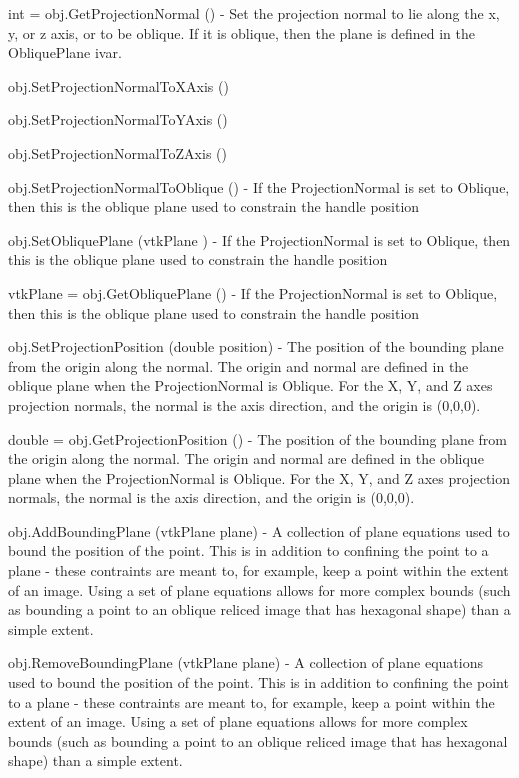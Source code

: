 \begin{DoxyItemize}
\item {\ttfamily int = obj.\-Get\-Projection\-Normal ()} -\/ Set the projection normal to lie along the x, y, or z axis, or to be oblique. If it is oblique, then the plane is defined in the Oblique\-Plane ivar.  
\item {\ttfamily obj.\-Set\-Projection\-Normal\-To\-X\-Axis ()}  
\item {\ttfamily obj.\-Set\-Projection\-Normal\-To\-Y\-Axis ()}  
\item {\ttfamily obj.\-Set\-Projection\-Normal\-To\-Z\-Axis ()}  
\item {\ttfamily obj.\-Set\-Projection\-Normal\-To\-Oblique ()} -\/ If the Projection\-Normal is set to Oblique, then this is the oblique plane used to constrain the handle position  
\item {\ttfamily obj.\-Set\-Oblique\-Plane (vtk\-Plane )} -\/ If the Projection\-Normal is set to Oblique, then this is the oblique plane used to constrain the handle position  
\item {\ttfamily vtk\-Plane = obj.\-Get\-Oblique\-Plane ()} -\/ If the Projection\-Normal is set to Oblique, then this is the oblique plane used to constrain the handle position  
\item {\ttfamily obj.\-Set\-Projection\-Position (double position)} -\/ The position of the bounding plane from the origin along the normal. The origin and normal are defined in the oblique plane when the Projection\-Normal is Oblique. For the X, Y, and Z axes projection normals, the normal is the axis direction, and the origin is (0,0,0).  
\item {\ttfamily double = obj.\-Get\-Projection\-Position ()} -\/ The position of the bounding plane from the origin along the normal. The origin and normal are defined in the oblique plane when the Projection\-Normal is Oblique. For the X, Y, and Z axes projection normals, the normal is the axis direction, and the origin is (0,0,0).  
\item {\ttfamily obj.\-Add\-Bounding\-Plane (vtk\-Plane plane)} -\/ A collection of plane equations used to bound the position of the point. This is in addition to confining the point to a plane -\/ these contraints are meant to, for example, keep a point within the extent of an image. Using a set of plane equations allows for more complex bounds (such as bounding a point to an oblique reliced image that has hexagonal shape) than a simple extent.  
\item {\ttfamily obj.\-Remove\-Bounding\-Plane (vtk\-Plane plane)} -\/ A collection of plane equations used to bound the position of the point. This is in addition to confining the point to a plane -\/ these contraints are meant to, for example, keep a point within the extent of an image. Using a set of plane equations allows for more complex bounds (such as bounding a point to an oblique reliced image that has hexagonal shape) than a simple extent.  

\end{DoxyItemize}
